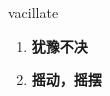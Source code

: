 
\begin{frame}
{\huge vacillate}
\begin{center}
\begin{enumerate}\Large
  \item \textbf{犹豫不决}
  \item \textbf{摇动，摇摆}
\end{enumerate}
\end{center}
\end{frame}
